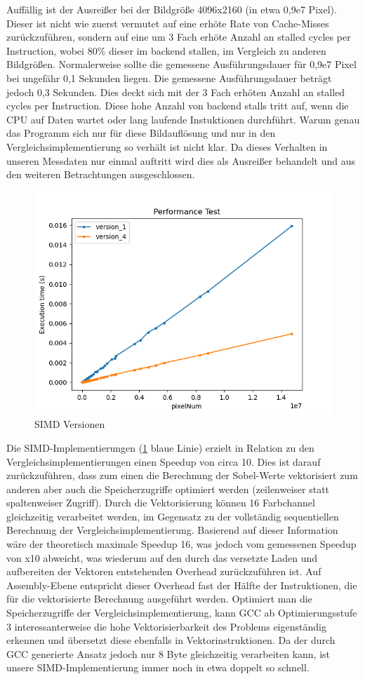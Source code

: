 \documentclass[course=erap]{aspdoc}
\begin{document}
Auffällig ist der Ausreißer bei der Bildgröße 4096x2160 (in etwa 0,9e7 Pixel). Dieser ist nicht wie zuerst vermutet auf eine erhöte Rate von Cache-Misses zurückzuführen, sondern auf eine um 3 Fach erhöte Anzahl an stalled cycles per Instruction, wobei 80\% dieser im backend stallen, im Vergleich zu anderen Bildgrößen.
Normalerweise sollte die gemessene Ausführungsdauer für 0,9e7 Pixel bei ungefähr 0,1 Sekunden liegen. Die gemessene Ausführungsdauer beträgt jedoch 0,3 Sekunden. Dies deckt sich mit der 3 Fach erhöten Anzahl an stalled cycles per Instruction.
Diese hohe Anzahl von backend stalls tritt auf, wenn die CPU auf Daten wartet oder lang laufende Instuktionen durchführt. Warum genau das Programm sich nur für diese Bildauflösung und nur in den Vergleichsimplementierung so verhält ist nicht klar.
Da dieses Verhalten in unseren Messdaten nur einmal auftritt wird dies als Ausreißer behandelt und aus den weiteren Betrachtungen ausgeschlossen.

\begin{figure}[H]
    \centering
    \includegraphics[width=.75\columnwidth]{graphics/version_1_4.png}
    \caption{SIMD Versionen}
    \label{fig:simd}
\end{figure}

Die SIMD-Implementierungen (\ref{fig:simd} blaue Linie) erzielt in Relation zu den Vergleichsimplementierungen einen Speedup von circa 10.
Dies ist darauf zurückzuführen, dass zum einen die Berechnung der Sobel-Werte vektorisiert zum anderen aber auch die Speicherzugriffe optimiert werden (zeilenweiser statt spaltenweiser Zugriff).
Durch die Vektorisierung können 16 Farbchannel gleichzeitig verarbeitet werden, im Gegensatz zu der vollständig sequentiellen Berechnung der Vergleichsimplementierung.
Basierend auf dieser Information wäre der theoretisch maximale Speedup 16, was jedoch vom gemessenen Speedup von x10 abweicht, was wiederum auf den durch das versetzte Laden und aufbereiten der Vektoren entstehenden Overhead zurückzuführen ist.
Auf Assembly-Ebene entspricht dieser Overhead fast der Hälfte der Instruktionen, die für die vektorisierte Berechnung ausgeführt werden.
Optimiert man die Speicherzugriffe der Vergleichsimplementierung, kann GCC ab Optimierungsstufe 3 interessanterweise die hohe Vektorisierbarkeit des Problems eigenständig erkennen und übersetzt diese ebenfalls in Vektorinstruktionen.
Da der durch GCC generierte Ansatz jedoch nur 8 Byte gleichzeitig verarbeiten kann, ist unsere SIMD-Implementierung immer noch in etwa doppelt so schnell.
\end{document}

